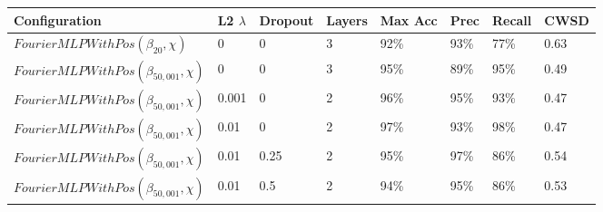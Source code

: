 \documentclass[10pt]{article}
\begin{document}
\begin{minipage}{\textwidth}
    \begin{center}
        \begin{tabular}{|l|l|l|l|l|l|l|l|}
            \hline
            Configuration & L2 $\lambda$ & Dropout & Layers & Max Acc & Prec & Recall & CWSD \\
            \hline
            $FourierMLPWithPos(\beta_{20}, \chi)$ & 0 & 0 & 3 & 92\% & 93\% & 77\% & 0.63 \\
            \hline
            $FourierMLPWithPos(\beta_{50,001}, \chi)$ & 0 & 0 & 3 & 95\% & 89\% & 95\% & 0.49 \\
            \hline
            $FourierMLPWithPos(\beta_{50,001}, \chi)$ & 0.001 & 0 & 2 & 96\% & 95\% & 93\% & 0.47 \\
            \hline
            $FourierMLPWithPos(\beta_{50,001}, \chi)$ & 0.01 & 0 & 2 & 97\% & 93\% & 98\% & 0.47 \\
            \hline
            $FourierMLPWithPos(\beta_{50,001}, \chi)$ & 0.01 & 0.25 & 2 & 95\% & 97\% & 86\% & 0.54 \\
            \hline
            $FourierMLPWithPos(\beta_{50,001}, \chi)$ & 0.01 & 0.5 & 2 & 94\% & 95\% & 86\% & 0.53 \\
            \hline
        \end{tabular}
    \end{center}
\end{minipage}
\end{document}
